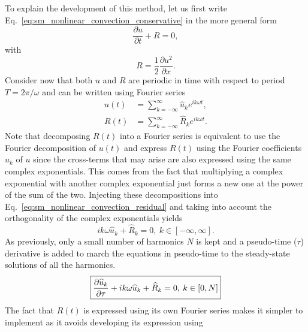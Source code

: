 To explain the development of this method, let us first 
write Eq.~\eqref{eq:sm_nonlinear_convection_conservative} 
in the more general form
\begin{equation}
	\frac{\partial u}{\partial t} + R = 0,
	\label{eq:sm_nonlinear_convection_residual}
\end{equation}
with
\begin{equation}
	R = \frac{1}{2} \frac{\partial u^2}{\partial x}.
\end{equation}
Consider now that both $u$ and $R$ are periodic
in time with respect to period $T = 2 \pi / \omega$
and can be written using Fourier series
\begin{equation}
	\begin{split}
		u(t) &= \sum_{k=-\infty}^{\infty} \widehat{u}_k e^{i k \omega t}, \\
		R(t) &= \sum_{k=-\infty}^{\infty} \widehat{R}_k e^{i k \omega t}.
	\end{split}
\end{equation}
Note that decomposing $R(t)$ into a Fourier series is equivalent
to use the Fourier decomposition of $u(t)$ and express
$R(t)$ using the Fourier coefficients $\widehat{u}_k$ of $u$
since the cross-terms that may arise are also expressed 
using the same complex exponentials. This comes from the fact
that multiplying a complex exponential with another complex exponential
just forms a new one at the power of the sum of the
two.
Injecting these decompositions into 
Eq.~\eqref{eq:sm_nonlinear_convection_residual} and taking into account
the orthogonality of the complex exponentials yields
\begin{equation}
	i k \omega \widehat{u}_k + \widehat{R}_k = 0, \: k \in [-\infty, \infty].
\end{equation}
As previously, only a small number of harmonics $N$ is kept and 
a pseudo-time ($\tau$) derivative is added to march the equations
in pseudo-time to the steady-state solutions of all the harmonics.
\begin{equation}
	\fbox{$
	\displaystyle \frac{\partial \widehat{u}_k}{\partial \tau} + 
	i k \omega \widehat{u}_k + \widehat{R}_k = 0, \: k \in [0, N]
	$}
	\label{eq:sm_nlfd_subset_eq}
\end{equation}
The fact that $R(t)$ is expressed using its own Fourier series 
makes it simpler to implement 
as it avoids developing its expression using 

